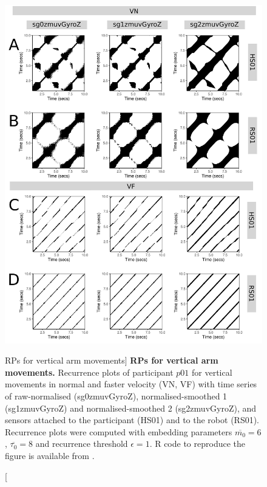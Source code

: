 \begin{figure}
\centering
\includegraphics[height=0.80\textheight]{fig_6_07}
\caption
	[RPs for vertical arm movements]{
	{\bf RPs for vertical arm movements.}	
	Recurrence plots %
	of participant $p01$ for vertical movements in normal and faster 
	velocity (VN, VF) with time series of raw-normalised (sg0zmuvGyroZ), 
	normalised-smoothed 1 (sg1zmuvGyroZ) and 
	normalised-smoothed 2 (sg2zmuvGyroZ), and 
	sensors attached to the participant (HS01) and to the robot (RS01).
	Recurrence plots were computed with 
	embedding parameters $\overline{m_0}=6$, $\overline{\tau_0}=8$ and
	recurrence threshold $\epsilon=1$.
	R code to reproduce the figure is available from \cite{hwum2018}.
        }
    \label{fig:rp_aV}
\end{figure}

